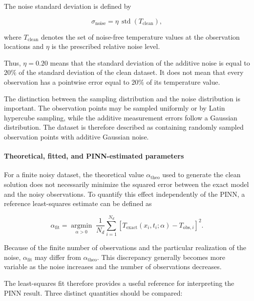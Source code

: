 The noise standard deviation is defined by

\begin{equation}
\sigma_{\mathrm{noise}}
=
\eta\,
\operatorname{std}
\left(
T_{\mathrm{clean}}
\right),
\end{equation}

where $T_{\mathrm{clean}}$ denotes the set of noise-free temperature values at
the observation locations and $\eta$ is the prescribed relative noise level.

Thus, $\eta=0.20$ means that the standard deviation of the additive noise is
equal to $20\%$ of the standard deviation of the clean dataset. It does not mean
that every observation has a pointwise error equal to $20\%$ of its temperature
value.

The distinction between the sampling distribution and the noise distribution
is important. The observation points may be sampled uniformly or by Latin
hypercube sampling, while the additive measurement errors follow a Gaussian
distribution. The dataset is therefore described as containing randomly
sampled observation points with additive Gaussian noise.

\paragraph{Theoretical, fitted, and PINN-estimated parameters}

For a finite noisy dataset, the theoretical value
$\alpha_{\mathrm{theo}}$ used to generate the clean solution does not
necessarily minimize the squared error between the exact model and the noisy
observations. To quantify this effect independently of the PINN, a reference
least-squares estimate can be defined as

\begin{equation}
\alpha_{\mathrm{fit}}
=
\underset{\alpha>0}{\operatorname{argmin}}
\;
\frac{1}{N_d}
\sum_{i=1}^{N_d}
\left[
T_{\mathrm{exact}}(x_i,t_i;\alpha)
-
T_{\mathrm{obs},i}
\right]^2.
\end{equation}

Because of the finite number of observations and the particular realization of
the noise, $\alpha_{\mathrm{fit}}$ may differ from
$\alpha_{\mathrm{theo}}$. This discrepancy generally becomes more variable as
the noise increases and the number of observations decreases.

The least-squares fit therefore provides a useful reference for interpreting
the PINN result. Three distinct quantities should be compared:


